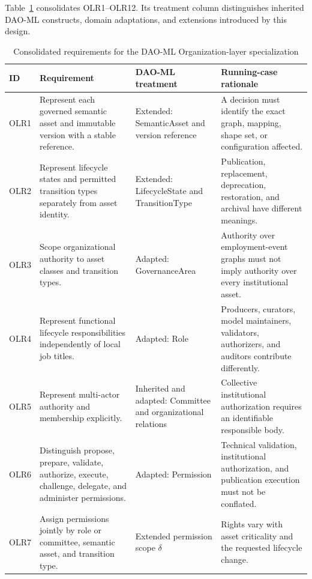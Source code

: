 \documentclass[journal]{IEEEtran}
\begin{document}
Table~\ref{tab:org_requirements} consolidates OLR1--OLR12.
Its treatment column distinguishes inherited DAO-ML constructs,
domain adaptations, and extensions introduced by this design.

\begin{table}[t]
\caption{Consolidated requirements for the DAO-ML Organization-layer
specialization}
\label{tab:org_requirements}
\centering
\renewcommand{\arraystretch}{1.12}
\setlength{\tabcolsep}{4pt}
\begin{tabular}{p{1.0cm}p{5.1cm}p{4.1cm}p{5.2cm}}
\hline
\textbf{ID} &
\textbf{Requirement} &
\textbf{DAO-ML treatment} &
\textbf{Running-case rationale}\\
\hline

OLR1 &
Represent each governed semantic asset and immutable version
with a stable reference. &
Extended: SemanticAsset and version reference &
A decision must identify the exact graph, mapping, shape set,
or configuration affected.\\

OLR2 &
Represent lifecycle states and permitted transition types
separately from asset identity. &
Extended: LifecycleState and TransitionType &
Publication, replacement, deprecation, restoration, and archival
have different meanings.\\

OLR3 &
Scope organizational authority to asset classes and transition
types. &
Adapted: Governance\allowbreak Area &
Authority over employment-event graphs must not imply authority
over every institutional asset.\\

OLR4 &
Represent functional lifecycle responsibilities independently
of local job titles. &
Adapted: Role &
Producers, curators, model maintainers, validators, authorizers,
and auditors contribute differently.\\

OLR5 &
Represent multi-actor authority and membership explicitly. &
Inherited and adapted: Committee and organizational relations &
Collective institutional authorization requires an identifiable
responsible body.\\

OLR6 &
Distinguish propose, prepare, validate, authorize, execute,
challenge, delegate, and administer permissions. &
Adapted: Permission &
Technical validation, institutional authorization, and publication
execution must not be conflated.\\

OLR7 &
Assign permissions jointly by role or committee, semantic asset,
and transition type. &
Extended permission scope $\delta$ &
Rights vary with asset criticality and the requested lifecycle
change.\\


\end{tabular}
\end{table}
\end{document}
